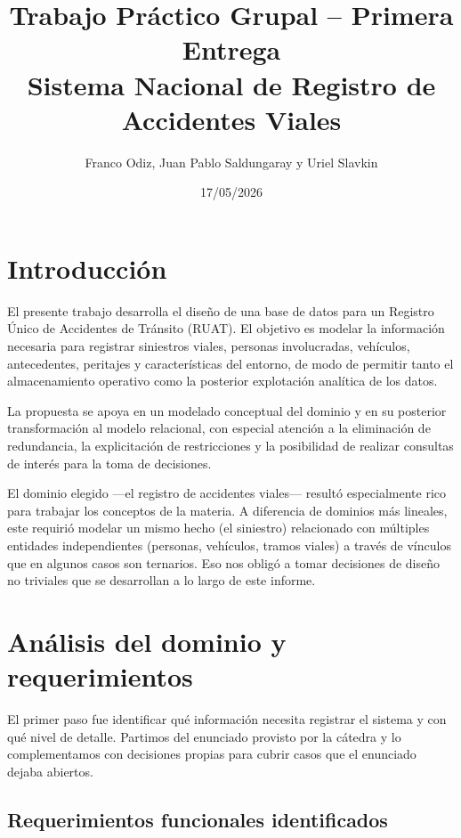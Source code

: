 \documentclass[12pt,a4paper]{article}
\title{Trabajo Práctico Grupal -- Primera Entrega\\Sistema Nacional de Registro de Accidentes Viales}
\author{Franco Odiz, Juan Pablo Saldungaray y Uriel Slavkin}
\date{17/05/2026}
\begin{document}
\maketitle

\section{Introducción}

El presente trabajo desarrolla el diseño de una base de datos para un Registro Único de Accidentes de Tránsito (RUAT). El objetivo es modelar la información necesaria para registrar siniestros viales, personas involucradas, vehículos, antecedentes, peritajes y características del entorno, de modo de permitir tanto el almacenamiento operativo como la posterior explotación analítica de los datos.

La propuesta se apoya en un modelado conceptual del dominio y en su posterior transformación al modelo relacional, con especial atención a la eliminación de redundancia, la explicitación de restricciones y la posibilidad de realizar consultas de interés para la toma de decisiones.

El dominio elegido ---el registro de accidentes viales--- resultó especialmente rico para trabajar los conceptos de la materia. A diferencia de dominios más lineales, este requirió modelar un mismo hecho (el siniestro) relacionado con múltiples entidades independientes (personas, vehículos, tramos viales) a través de vínculos que en algunos casos son ternarios. Eso nos obligó a tomar decisiones de diseño no triviales que se desarrollan a lo largo de este informe.

\section{Análisis del dominio y requerimientos}

El primer paso fue identificar qué información necesita registrar el sistema y con qué nivel de detalle. Partimos del enunciado provisto por la cátedra y lo complementamos con decisiones propias para cubrir casos que el enunciado dejaba abiertos.

\subsection*{Requerimientos funcionales identificados}
\end{document}
